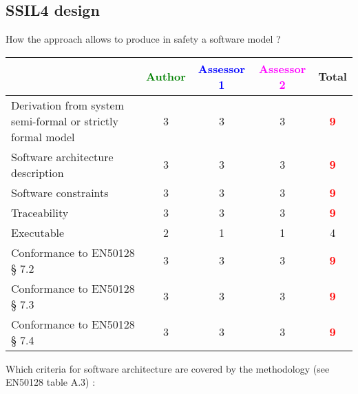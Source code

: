 \subsection{SSIL4 design}

How the approach allows to produce in safety a software model ?

\begin{tabular}{|l | c | c | c | c|}
\hline
& \textcolor{green}{Author} & \textcolor{blue}{Assessor 1} & \textcolor{magenta}{Assessor 2} & Total \\
\hline
Derivation from system semi-formal or strictly formal model  &3 & 3    & 3    & \textcolor{red}{\textbf{9}} \\
\hline 
Software architecture description  &3 & 3    & 3    & \textcolor{red}{\textbf{9}} \\
\hline
Software constraints  &3 & 3    & 3    & \textcolor{red}{\textbf{9}} \\
\hline
Traceability  &3 & 3    & 3    & \textcolor{red}{\textbf{9}} \\
\hline
Executable  &2 & 1    & 1    & 4     \\
\hline
Conformance to EN50128 § 7.2  &3 & 3    & 3    & \textcolor{red}{\textbf{9}} \\
\hline
Conformance to EN50128 § 7.3  &3 & 3    & 3    & \textcolor{red}{\textbf{9}} \\
\hline
Conformance to EN50128 § 7.4  & 3    & 3    & 3    & \textcolor{red}{\textbf{9}} \\
\hline
\end{tabular}

Which criteria for software architecture are covered by the methodology
(see EN50128 table A.3) :

